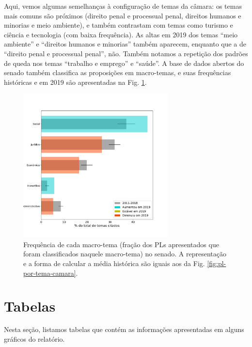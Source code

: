 \documentclass[12pt,a4paper]{article}
\newcommand{\HX}[1]{{\centering\color{red}\large<#1>}}
\begin{document}
Aqui, vemos algumas semelhanças à configuração de temas da câmara: os temas mais comuns são
próximos (direito penal e processual penal, direitos humanos e minorias e meio ambiente), e
também contrastam com temas como turismo e ciência e tecnologia (com baixa frequência).
As altas em 2019 dos temas ``meio ambiente'' e ``direitos humanos e minorias'' também aparecem,
enquanto que a de ``direito penal e processual penal'', não. Também notamos a repetição dos
padrões de queda nos temas ``trabalho e emprego'' e ``saúde''.
A base de dados abertos do senado também classifica as proposições em macro-temas, e suas frequências
históricas e em 2019 são apresentadas na Fig. \ref{fig:pl-por-macrotema-senado}.

\begin{figure}[H]
\centering
\includegraphics[width=0.7\textwidth]{graficos/senado/pls-macro-temas-senado-r-completo.pdf}
\caption{Frequência de cada macro-tema (fração dos PLs apresentados que foram classificados
  naquele macro-tema) no senado. A representação e a forma de calcular a média histórica são iguais
  aos da Fig. \ref{fig:pl-por-tema-camara}.}
\label{fig:pl-por-macrotema-senado}
\end{figure}


\section{Tabelas}
\pagestyle{final}
\label{sec:tabelas}
Nesta seção, listamos tabelas que contém as informações apresentadas em alguns gráficos do relatório.
\end{document}
